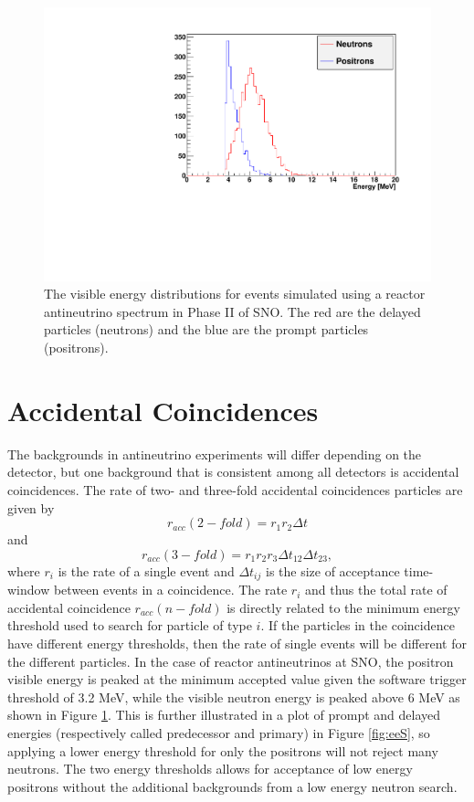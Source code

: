 \documentclass[preprint,12pt]{elsarticle}
\begin{document}
\begin{figure}[htbp]
   \centering
   \includegraphics[width=14 cm]{energyS.pdf} %
   \caption{The visible energy distributions for events simulated using a reactor antineutrino spectrum in Phase II of SNO. The red are the delayed particles (neutrons) and the blue are the prompt particles (positrons).}
   \label{fig:nuEn}
\end{figure}

\section{Accidental Coincidences}
\label{sec:bg} 
The backgrounds in antineutrino experiments will differ depending on the detector, but one background that is consistent among all detectors is accidental coincidences.  The rate of two- and three-fold accidental coincidences  particles are given by
\begin{equation}
r_{acc}(2-fold)=r_1r_2\Delta t
\label{eq:r2}
\end{equation}
and
\begin{equation}
r_{acc}(3-fold)=r_1r_2r_3\Delta t_{12}\Delta t_{23},
\label{eq:r3}
\end{equation}
where $r_i$ is the rate of a single event and $\Delta t_{ij}$ is the size of acceptance time-window between events in a coincidence.  The rate $r_i$ and thus the total rate of accidental coincidence $r_{acc}(n-fold)$ is directly related to the minimum energy threshold used to search for particle of type $i$. If the particles in the coincidence have different energy thresholds, then the rate of single events will be different for the different particles.  In the case of reactor antineutrinos at SNO, the positron visible energy is peaked at the minimum accepted value given the software trigger threshold of 3.2 MeV, while the visible neutron energy is peaked above 6 MeV as shown in Figure \ref{fig:nuEn}. This is further illustrated in a plot of prompt and delayed energies (respectively called predecessor and primary) in Figure \ref{fig:eeS}, so applying a lower energy threshold for only the positrons will not reject many neutrons.  The two energy thresholds allows for acceptance of low energy positrons without the additional backgrounds from a low energy neutron search. 
\end{document}
